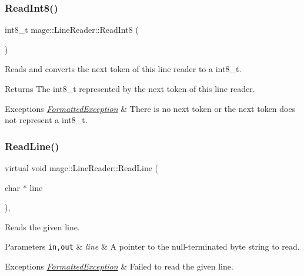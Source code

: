 \subsubsection{\texorpdfstring{Read\+Int8()}{ReadInt8()}}
{\footnotesize\ttfamily int8\+\_\+t mage\+::\+Line\+Reader\+::\+Read\+Int8 (\begin{DoxyParamCaption}{ }\end{DoxyParamCaption})\hspace{0.3cm}{\ttfamily [protected]}}

Reads and converts the next token of this line reader to a {\ttfamily int8\+\_\+t}.

\begin{DoxyReturn}{Returns}
The {\ttfamily int8\+\_\+t} represented by the next token of this line reader. 
\end{DoxyReturn}

\begin{DoxyExceptions}{Exceptions}
{\em \hyperlink{structmage_1_1_formatted_exception}{Formatted\+Exception}} & There is no next token or the next token does not represent a {\ttfamily int8\+\_\+t}. \\
\hline
\end{DoxyExceptions}
\hypertarget{classmage_1_1_line_reader_acfb2f7279ec77d070a86d7db812d4745}{}\label{classmage_1_1_line_reader_acfb2f7279ec77d070a86d7db812d4745} 
\subsubsection{\texorpdfstring{Read\+Line()}{ReadLine()}}
{\footnotesize\ttfamily virtual void mage\+::\+Line\+Reader\+::\+Read\+Line (\begin{DoxyParamCaption}\item[{char $\ast$}]{line }\end{DoxyParamCaption})\hspace{0.3cm}{\ttfamily [private]}, {}}

Reads the given line.


\begin{DoxyParams}[1]{Parameters}
\mbox{\tt in,out}  & {\em line} & A pointer to the null-\/terminated byte string to read. \\
\hline
\end{DoxyParams}

\begin{DoxyExceptions}{Exceptions}
{\em \hyperlink{structmage_1_1_formatted_exception}{Formatted\+Exception}} & Failed to read the given line. \\
\hline
\end{DoxyExceptions}


